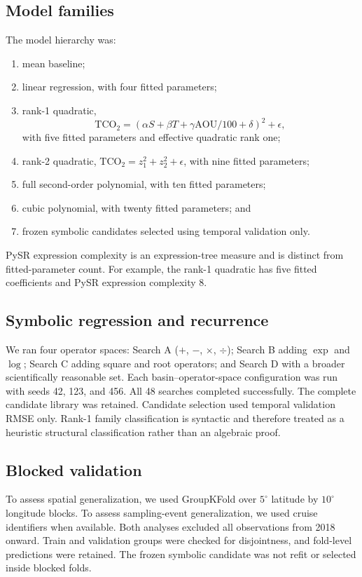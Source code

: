 \documentclass[12pt,a4paper]{article}
\newcommand{\tco}{\mathrm{TCO_2}}
\newcommand{\aou}{\mathrm{AOU}}
\begin{document}



\subsection{Model families}
The model hierarchy was:
\begin{enumerate}[nosep]
\item mean baseline;
\item linear regression, with four fitted parameters;
\item rank-1 quadratic,
\begin{equation}
\tco=(\alpha S+\beta T+\gamma\aou/100+\delta)^2+\epsilon,
\end{equation}
with five fitted parameters and effective quadratic rank one;
\item rank-2 quadratic, $\tco=z_1^2+z_2^2+\epsilon$, with nine fitted parameters;
\item full second-order polynomial, with ten fitted parameters;
\item cubic polynomial, with twenty fitted parameters; and
\item frozen symbolic candidates selected using temporal validation only.
\end{enumerate}

PySR expression complexity is an expression-tree measure and is distinct from fitted-parameter count. For example, the rank-1 quadratic has five fitted coefficients and PySR expression complexity 8.

\subsection{Symbolic regression and recurrence}
We ran four operator spaces: Search A ($+$, $-$, $\times$, $\div$); Search B adding $\exp$ and $\log$; Search C adding square and root operators; and Search D with a broader scientifically reasonable set. Each basin--operator-space configuration was run with seeds 42, 123, and 456. All 48 searches completed successfully. The complete candidate library was retained. Candidate selection used temporal validation RMSE only. Rank-1 family classification is syntactic and therefore treated as a heuristic structural classification rather than an algebraic proof.

\subsection{Blocked validation}
To assess spatial generalization, we used GroupKFold over $5^\circ$ latitude by $10^\circ$ longitude blocks. To assess sampling-event generalization, we used cruise identifiers when available. Both analyses excluded all observations from 2018 onward. Train and validation groups were checked for disjointness, and fold-level predictions were retained. The frozen symbolic candidate was not refit or selected inside blocked folds.
\end{document}
